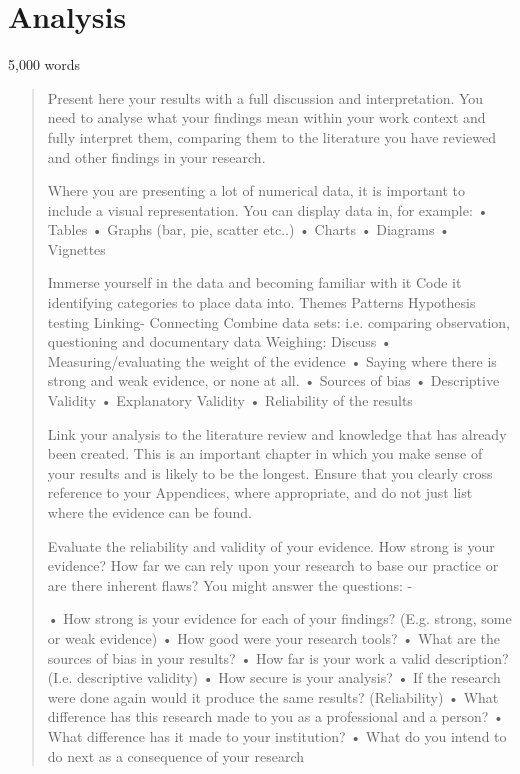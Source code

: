 \section{Analysis}
5,000 words
\begin{quote}
Present here your results with a full discussion and interpretation. You need to analyse what your findings mean within your work context and fully interpret them, comparing them to the literature you have reviewed and other findings in your research.

Where you are presenting a lot of numerical data, it is important to include a visual representation. You can display data in, for example:
•	Tables
•	Graphs (bar, pie, scatter etc..)
•	Charts 
•	Diagrams
•	Vignettes

Immerse yourself in the data and becoming familiar with it
Code it 	identifying categories to place data into.
Themes
Patterns
Hypothesis testing
Linking- Connecting
Combine data sets: i.e. comparing observation, questioning and documentary data
Weighing: Discuss
•	Measuring/evaluating the weight of the evidence
•	Saying where there is strong and weak evidence, or none at all. 
•	Sources of bias
•	Descriptive Validity
•	Explanatory Validity
•	Reliability of the results

Link your analysis to the literature review and knowledge that has already been created. This is an important chapter in which you make sense of your results and is likely to be the longest. Ensure that you clearly cross reference to your Appendices, where appropriate, and do not just list where the evidence can be found.

Evaluate the reliability and validity of your evidence. How strong is your evidence?  How far we can rely upon your research to base our practice or are there inherent flaws? You might answer the questions: -

•	How strong is your evidence for each of your findings? (E.g. strong, some or weak evidence) 
•	How good were your research tools?
•	What are the sources of bias in your results?
•	How far is your work a valid description? (I.e. descriptive validity)
•	How secure is your analysis? 
•	If the research were done again would it produce the same results? (Reliability)
•	What difference has this research made to you as a professional and a person?
•	What difference has it made to your institution?
•	What do you intend to do next as a consequence of your research
\end{quote}

